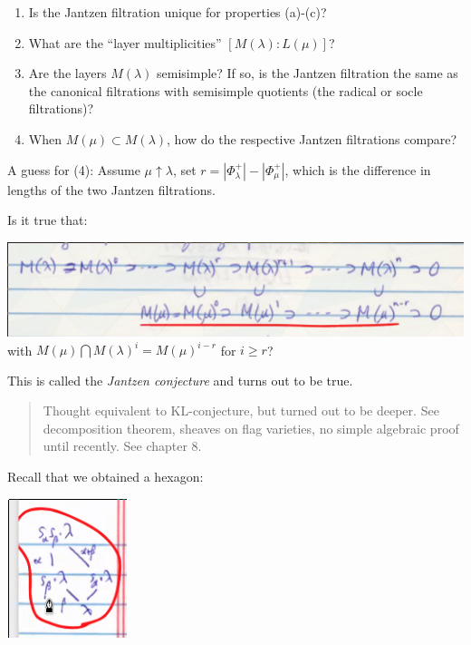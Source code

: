 \documentclass[11pt]{scrartcl}
\theoremstyle{definition}
\theoremstyle{theorem}
\theoremstyle{proof}
\theoremstyle{definition}
\theoremstyle{break}
\theoremstyle{problem}
\providecommand{\tightlist}{%
  \setlength{\itemsep}{0pt}\setlength{\parskip}{0pt}}
\newcommand{\abs}[1]{{\left\lvert {#1} \right\rvert}}
\newcommand{\up}[0]{\uparrow}
\newcommand{\intersect}[0]{\bigcap}
\begin{document}
\begin{enumerate}
\def\labelenumi{\arabic{enumi}.}
\tightlist
\item
  Is the Jantzen filtration unique for properties (a)-(c)?
\item
  What are the ``layer multiplicities'' \([M(\lambda): L(\mu)]\)?
\item
  Are the layers \(M(\lambda)\) semisimple? If so, is the Jantzen
  filtration the same as the canonical filtrations with semisimple
  quotients (the radical or socle filtrations)?
\item
  When \(M(\mu) \subset M(\lambda)\), how do the respective Jantzen
  filtrations compare?
\end{enumerate}

A guess for (4): Assume \(\mu \up \lambda\), set
\(r = \abs{\Phi^+_\lambda} - \abs{\Phi_\mu^+}\), which is the difference
in lengths of the two Jantzen filtrations.

Is it true that:

\includegraphics{figures/2020-04-03-09:28.png}\\

with \(M(\mu) \intersect M(\lambda)^i = M(\mu)^{i-r}\) for \(i\geq r\)?

This is called the \emph{Jantzen conjecture} and turns out to be true.

\begin{quote}
Thought equivalent to KL-conjecture, but turned out to be deeper. See
decomposition theorem, sheaves on flag varieties, no simple algebraic
proof until recently. See chapter 8.
\end{quote}

Recall that we obtained a hexagon:

\includegraphics{figures/2020-04-03-09:32.png}\\
\end{document}
